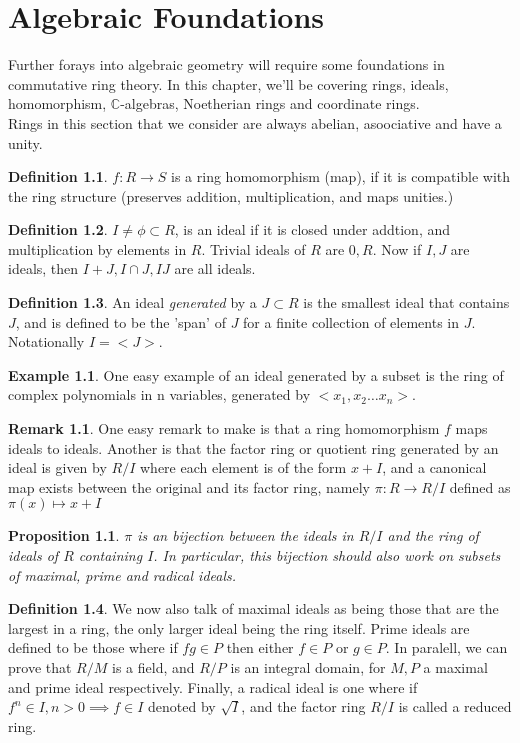 \documentclass[12pt]{book}
\newtheorem{proposition}{Proposition}[section]
\theoremstyle{definition}
\newtheorem*{definition}{Definition}
\newtheorem{example}{Example}[chapter]
\newtheorem*{remark}{Remark}
\begin{document}
\chapter{Algebraic Foundations}
Further forays into algebraic geometry will require some foundations in commutative ring theory. In this chapter, we'll be covering rings, ideals, homomorphism, $\mathbb{C}$-algebras, Noetherian rings and coordinate rings.\\
Rings in this section that we consider are always abelian, asoociative and have a unity. 
\begin{definition}
    $f: R \to S$ is a ring homomorphism (map), if it is compatible with the ring structure (preserves addition, multiplication, and maps unities.)
\end{definition}
\begin{definition}
    $I \neq \phi \subset R$, is an ideal if it is closed under addtion, and multiplication by elements in $R$. Trivial ideals of $R$ are $0, R$. Now if $I, J$ are ideals, then $I + J, I \cap J, IJ$ are all ideals.
\end{definition}
\begin{definition}
    An ideal \textit{generated} by a $J \subset R$ is the smallest ideal that contains $J$, and is defined to be the 'span' of $J$ for a finite collection of elements in $J$. Notationally $I = <J>$.
\end{definition}
\begin{example}
    One easy example of an ideal generated by a subset is the ring of complex polynomials in n variables, generated by $<x_1, x_2 \ldots x_n>$.
\end{example}
\begin{remark}
    One easy remark to make is that a ring homomorphism $f$ maps ideals to ideals. Another is that the factor ring or quotient ring generated by an ideal is given by $R/I$ where each element is of the form $x + I$, and a canonical map exists between the original and its factor ring, namely $\pi: R \to R/I$ defined as $\pi(x) \mapsto x + I$
\end{remark}
\begin{proposition}
    $\pi$ is an bijection between the ideals in $R/I$ and the ring of ideals of $R$ containing $I$. In particular, this bijection should also work on subsets of maximal, prime and radical ideals.
\end{proposition}
\begin{definition}
    We now also talk of maximal ideals as being those that are the largest in a ring, the only larger ideal being the ring itself. Prime ideals are defined to be those where if $fg \in P$ then either $f \in P$ or $g \in P$. In paralell, we can prove that $R/M$ is a field, and $R/P$ is an integral domain, for $M, P$ a maximal and prime ideal respectively.
    Finally, a radical ideal is one where if $f^n \in I, n > 0 \implies f \in I$ denoted by $\sqrt{I}$, and the factor ring $R/I$ is called a reduced ring.
\end{definition}
\end{document}
